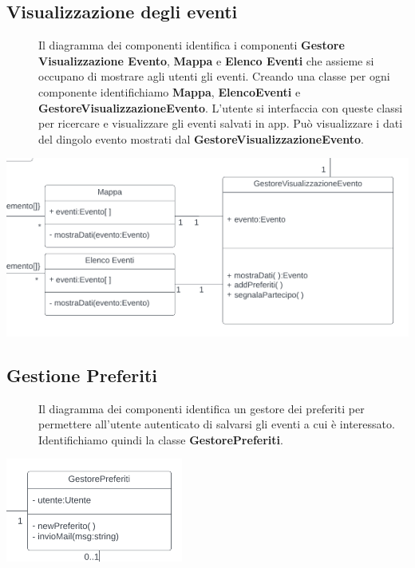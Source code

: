 \documentclass{article}
\begin{document}
\subsection{Visualizzazione degli eventi}
\begin{description}
    \item[] Il diagramma dei componenti identifica i componenti \textbf{Gestore Visualizzazione Evento}, \textbf{Mappa} e \textbf{Elenco Eventi} che assieme si occupano di mostrare agli utenti gli eventi. Creando una classe per ogni componente identifichiamo \textbf{Mappa}, \textbf{ElencoEventi} e \textbf{GestoreVisualizzazioneEvento}. L'utente si interfaccia con queste classi per ricercare e visualizzare gli eventi salvati in app. Può visualizzare i dati del dingolo evento mostrati dal \textbf{GestoreVisualizzazioneEvento}.
\end{description}
\begin{center}
    \item[] \includegraphics[scale=0.7]{visualizzaEventi.png}
\end{center}
\newpage
\subsection{Gestione Preferiti}
\begin{description}
    \item[] Il diagramma dei componenti identifica un gestore dei preferiti per permettere all'utente autenticato di salvarsi gli eventi a cui è interessato. Identifichiamo quindi la classe \textbf{GestorePreferiti}.
\end{description}
\begin{center}
    \item[] \includegraphics[scale=0.7]{preferiti.png}
\end{center}
\end{document}
